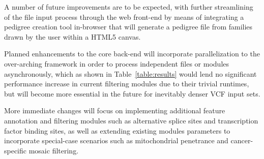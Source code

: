 A number of future improvements are to be expected, with further streamlining of the file input process through the web front-end by means of integrating a pedigree creation tool in-browser that will generate a pedigree file from families drawn by the user within a HTML5 canvas.

Planned enhancements to the core \app back-end will incorporate parallelization to the over-arching framework in order to process independent files or modules asynchronously, which as shown in Table~\ref{table:results} would lend no significant performance increase in current filtering modules due to their trivial runtimes, but will become more essential in the future for inevitably denser VCF input sets.

More immediate changes will focus on implementing additional feature annotation and filtering modules such as alternative splice sites and transcription factor binding sites, as well as extending existing modules parameters to incorporate special-case scenarios such as mitochondrial penetrance and cancer-specific mosaic filtering.

